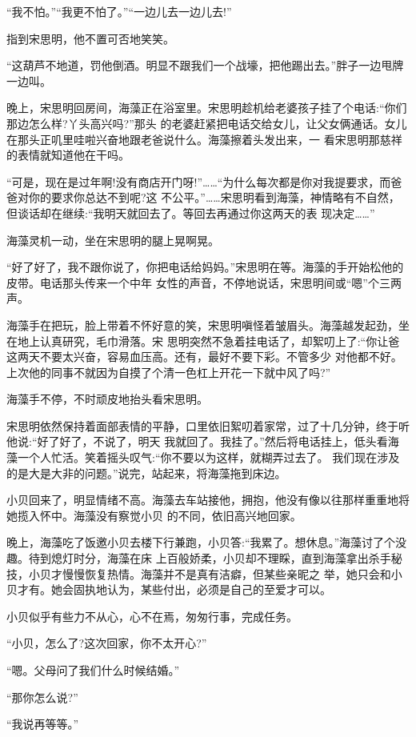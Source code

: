 \documentclass[11pt,a4paper,onecolumn]{article}
\begin{document}
``我不怕。''``我更不怕了。''``一边儿去一边儿去!''

指到宋思明，他不置可否地笑笑。

``这葫芦不地道，罚他倒酒。明显不跟我们一个战壕，把他踢出去。''胖子一边甩牌一边叫。

晚上，宋思明回房间，海藻正在浴室里。宋思明趁机给老婆孩子挂了个电话:``你们那边怎么样?丫头高兴吗?''那头
的老婆赶紧把电话交给女儿，让父女俩通话。女儿在那头正叽里哇啦兴奋地跟老爸说什么。海藻擦着头发出来，一
看宋思明那慈祥的表情就知道他在干吗。

``可是，现在是过年啊!没有商店开门呀!''……``为什么每次都是你对我提要求，而爸爸对你的要求你总达不到呢?这
不公平。''……宋思明看到海藻，神情略有不自然，但谈话却在继续:``我明天就回去了。等回去再通过你这两天的表
现决定……''

海藻灵机一动，坐在宋思明的腿上晃啊晃。

``好了好了，我不跟你说了，你把电话给妈妈。''宋思明在等。海藻的手开始松他的皮带。电话那头传来一个中年
女性的声音，不停地说话，宋思明间或``嗯''个三两声。

海藻手在把玩，脸上带着不怀好意的笑，宋思明嗔怪着皱眉头。海藻越发起劲，坐在地上认真研究，毛巾滑落。宋
思明突然不急着挂电话了，却絮叨上了:``你让爸这两天不要太兴奋，容易血压高。还有，最好不要下彩。不管多少
对他都不好。上次他的同事不就因为自摸了个清一色杠上开花一下就中风了吗?''

海藻手不停，不时顽皮地抬头看宋思明。

宋思明依然保持着面部表情的平静，口里依旧絮叨着家常，过了十几分钟，终于听他说:``好了好了，不说了，明天
我就回了。我挂了。''然后将电话挂上，低头看海藻一个人忙活。笑着摇头叹气:``你不要以为这样，就糊弄过去了。
我们现在涉及的是大是大非的问题。''说完，站起来，将海藻拖到床边。

小贝回来了，明显情绪不高。海藻去车站接他，拥抱，他没有像以往那样重重地将她揽入怀中。海藻没有察觉小贝
的不同，依旧高兴地回家。

晚上，海藻吃了饭邀小贝去楼下行兼跑，小贝答:``我累了。想休息。''海藻讨了个没趣。待到熄灯时分，海藻在床
上百般娇柔，小贝却不理睬，直到海藻拿出杀手秘技，小贝才慢慢恢复热情。海藻并不是真有洁癖，但某些亲昵之
举，她只会和小贝才有。她会固执地认为，某些付出，必须是自己的至爱才可以。

小贝似乎有些力不从心，心不在焉，匆匆行事，完成任务。

``小贝，怎么了?这次回家，你不太开心?''

``嗯。父母问了我们什么时候结婚。''

``那你怎么说?''

``我说再等等。''
\end{document}
